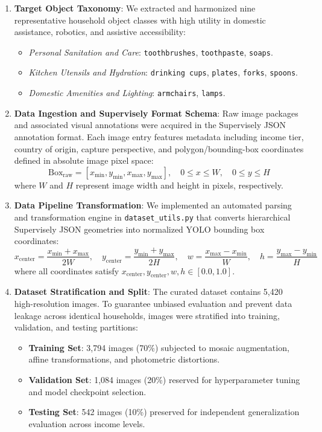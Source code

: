 \begin{enumerate}[label=\arabic*)]
    \item \textbf{Target Object Taxonomy}: We extracted and harmonized nine representative household object classes with high utility in domestic assistance, robotics, and assistive accessibility:
    \begin{itemize}
        \item \textit{Personal Sanitation and Care}: \texttt{toothbrushes}, \texttt{toothpaste}, \texttt{soaps}.
        \item \textit{Kitchen Utensils and Hydration}: \texttt{drinking cups}, \texttt{plates}, \texttt{forks}, \texttt{spoons}.
        \item \textit{Domestic Amenities and Lighting}: \texttt{armchairs}, \texttt{lamps}.
    \end{itemize}
    \item \textbf{Data Ingestion and Supervisely Format Schema}: Raw image packages and associated visual annotations were acquired in the Supervisely JSON annotation format. Each image entry features metadata including income tier, country of origin, capture perspective, and polygon/bounding-box coordinates defined in absolute image pixel space:
    \begin{equation}
        \text{Box}_{\text{raw}} = [x_{\min}, y_{\min}, x_{\max}, y_{\max}], \quad 0 \leq x \leq W, \quad 0 \leq y \leq H
    \end{equation}
    where $W$ and $H$ represent image width and height in pixels, respectively.
    \item \textbf{Data Pipeline Transformation}: We implemented an automated parsing and transformation engine in \texttt{dataset\_utils.py} that converts hierarchical Supervisely JSON geometries into normalized YOLO bounding box coordinates:
    \begin{equation}
        x_{\text{center}} = \frac{x_{\min} + x_{\max}}{2W}, \quad y_{\text{center}} = \frac{y_{\min} + y_{\max}}{2H}, \quad w = \frac{x_{\max} - x_{\min}}{W}, \quad h = \frac{y_{\max} - y_{\min}}{H}
        \label{eq:yolo_norm}
    \end{equation}
    where all coordinates satisfy $x_{\text{center}}, y_{\text{center}}, w, h \in [0.0, 1.0]$.
    \item \textbf{Dataset Stratification and Split}: The curated dataset contains 5,420 high-resolution images. To guarantee unbiased evaluation and prevent data leakage across identical households, images were stratified into training, validation, and testing partitions:
    \begin{itemize}
        \item \textbf{Training Set}: 3,794 images (70\%) subjected to mosaic augmentation, affine transformations, and photometric distortions.
        \item \textbf{Validation Set}: 1,084 images (20\%) reserved for hyperparameter tuning and model checkpoint selection.
        \item \textbf{Testing Set}: 542 images (10\%) preserved for independent generalization evaluation across income levels.
    \end{itemize}
\end{enumerate}

